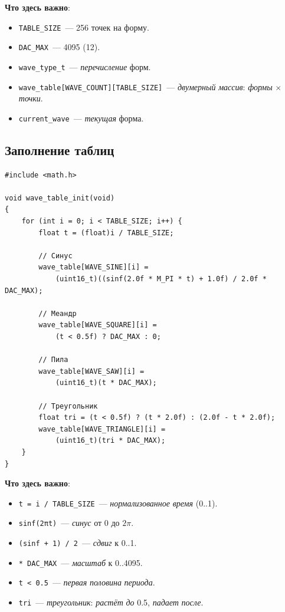\textbf{Что здесь важно}:
\begin{itemize}
    \item \texttt{TABLE\_SIZE}~--- \num{256} точек на форму.
    \item \texttt{DAC\_MAX}~--- \num{4095} (\SI{12}{\bit}).
    \item \texttt{wave\_type\_t}~--- \emph{перечисление} форм.
    \item \texttt{wave\_table[WAVE\_COUNT][TABLE\_SIZE]}~---
          \emph{двумерный} \emph{массив}: \emph{формы} $\times$ \emph{точки}.
    \item \texttt{current\_wave}~--- \emph{текущая} форма.
\end{itemize}

\subsection{Заполнение таблиц}

\begin{listing}[htbp]
\begin{verbatim}
#include <math.h>

void wave_table_init(void)
{
    for (int i = 0; i < TABLE_SIZE; i++) {
        float t = (float)i / TABLE_SIZE;

        // Синус
        wave_table[WAVE_SINE][i] =
            (uint16_t)((sinf(2.0f * M_PI * t) + 1.0f) / 2.0f * DAC_MAX);

        // Меандр
        wave_table[WAVE_SQUARE][i] =
            (t < 0.5f) ? DAC_MAX : 0;

        // Пила
        wave_table[WAVE_SAW][i] =
            (uint16_t)(t * DAC_MAX);

        // Треугольник
        float tri = (t < 0.5f) ? (t * 2.0f) : (2.0f - t * 2.0f);
        wave_table[WAVE_TRIANGLE][i] =
            (uint16_t)(tri * DAC_MAX);
    }
}
\end{verbatim}
\caption{\texttt{wave\_table\_init()}~--- заполнение таблиц}
\label{lst:dds-table-init}
\end{listing}

\textbf{Что здесь важно}:
\begin{itemize}
    \item \texttt{t = i / TABLE\_SIZE}~--- \emph{нормализованное}
          \emph{время} (\num{0}..\num{1}).
    \item \texttt{sinf(2πt)}~--- \emph{синус} от \num{0}
          до $2\pi$.
    \item \texttt{(sinf + 1) / 2}~--- \emph{сдвиг} к \num{0}..\num{1}.
    \item \texttt{* DAC\_MAX}~--- \emph{масштаб} к \num{0}..\num{4095}.
    \item \texttt{t < 0.5}~--- \emph{первая} \emph{половина}
          \emph{периода}.
    \item \texttt{tri}~--- \emph{треугольник}: \emph{растёт}
          \emph{до} \num{0.5}, \emph{падает} \emph{после}.
\end{itemize}

